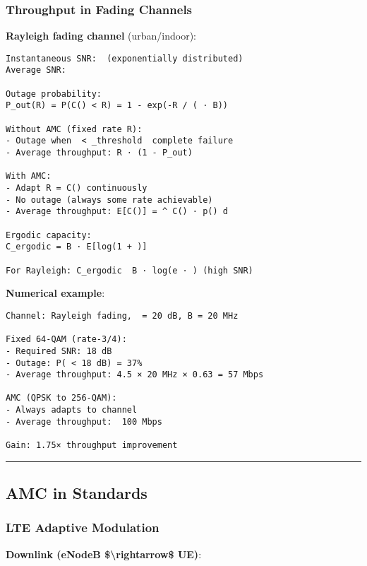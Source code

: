 \subsubsection{Throughput in Fading
Channels}\label{throughput-in-fading-channels}

\textbf{Rayleigh fading channel} (urban/indoor):

\begin{verbatim}
Instantaneous SNR:  (exponentially distributed)
Average SNR: 

Outage probability:
P_out(R) = P(C() < R) = 1 - exp(-R / ( · B))

Without AMC (fixed rate R):
- Outage when  < _threshold  complete failure
- Average throughput: R · (1 - P_out)

With AMC:
- Adapt R = C() continuously
- No outage (always some rate achievable)
- Average throughput: E[C()] = ^ C() · p() d

Ergodic capacity:
C_ergodic = B · E[log(1 + )]

For Rayleigh: C_ergodic  B · log(e · ) (high SNR)
\end{verbatim}

\textbf{Numerical example}:

\begin{verbatim}
Channel: Rayleigh fading,  = 20 dB, B = 20 MHz

Fixed 64-QAM (rate-3/4):
- Required SNR: 18 dB
- Outage: P( < 18 dB) = 37%
- Average throughput: 4.5 × 20 MHz × 0.63 = 57 Mbps

AMC (QPSK to 256-QAM):
- Always adapts to channel
- Average throughput:  100 Mbps

Gain: 1.75× throughput improvement
\end{verbatim}

\begin{center}\rule{0.5\linewidth}{0.5pt}\end{center}

\subsection{AMC in Standards}\label{amc-in-standards}

\subsubsection{LTE Adaptive Modulation}\label{lte-adaptive-modulation}

\textbf{Downlink (eNodeB \$\textbackslash rightarrow\$ UE)}:

